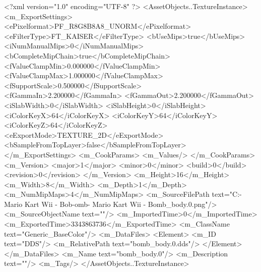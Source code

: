 <?xml version="1.0" encoding="UTF-8" ?>
<AssetObjects..TextureInstance>
	<m_ExportSettings>
		<ePixelformat>PF_R8G8B8A8_UNORM</ePixelformat>
		<eFilterType>FT_KAISER</eFilterType>
		<bUseMips>true</bUseMips>
		<iNumManualMips>0</iNumManualMips>
		<bCompleteMipChain>true</bCompleteMipChain>
		<fValueClampMin>0.000000</fValueClampMin>
		<fValueClampMax>1.000000</fValueClampMax>
		<fSupportScale>0.500000</fSupportScale>
		<fGammaIn>2.200000</fGammaIn>
		<fGammaOut>2.200000</fGammaOut>
		<iSlabWidth>0</iSlabWidth>
		<iSlabHeight>0</iSlabHeight>
		<iColorKeyX>64</iColorKeyX>
		<iColorKeyY>64</iColorKeyY>
		<iColorKeyZ>64</iColorKeyZ>
		<eExportMode>TEXTURE_2D</eExportMode>
		<bSampleFromTopLayer>false</bSampleFromTopLayer>
	</m_ExportSettings>
	<m_CookParams>
		<m_Values/>
	</m_CookParams>
	<m_Version>
		<major>1</major>
		<minor>0</minor>
		<build>0</build>
		<revision>0</revision>
	</m_Version>
	<m_Height>16</m_Height>
	<m_Width>8</m_Width>
	<m_Depth>1</m_Depth>
	<m_NumMipMaps>4</m_NumMipMaps>
	<m_SourceFilePath text="C:\Users\micka\Downloads\Wii - Mario Kart Wii - Bob-omb\Wii - Mario Kart Wii - Bomb\bomb_body.0.png"/>
	<m_SourceObjectName text=""/>
	<m_ImportedTime>0</m_ImportedTime>
	<m_ExportedTime>3343863736</m_ExportedTime>
	<m_ClassName text="Generic_BaseColor"/>
	<m_DataFiles>
		<Element>
			<m_ID text="DDS"/>
			<m_RelativePath text="bomb_body.0.dds"/>
		</Element>
	</m_DataFiles>
	<m_Name text="bomb_body.0"/>
	<m_Description text=""/>
	<m_Tags/>
</AssetObjects..TextureInstance>

